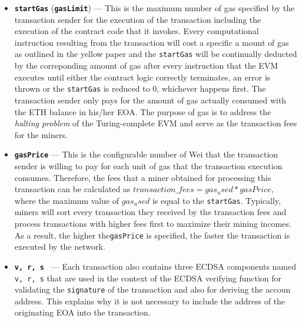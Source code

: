 \begin{itemize}
	\item \textbf{\texttt{startGas}} (\textbf{\texttt{gasLimit}}) --- This is the maximum number of gas specified by the transaction sender for the execution of the transaction including the execution of the contract code that it invokes.  Every computational instruction resulting from the transaction will cost a specific a mount of gas as outlined in the yellow paper \cite{wood2014ethereum} and the \texttt{startGas} will be continually deducted by the correponding amount of gas after every instruction that the EVM executes until either the contract logic correctly terminates, an error is thrown or the \texttt{startGas} is reduced to 0, whichever happens first. The transaction sender only pays for the amount of gas actually consumed with the ETH balance in his/her EOA. The purpose of gas is to address the \textit{halting problem} of the Turing-complete EVM and serve as the transaction fees for the miners.

	\item \textbf{\texttt{gasPrice}} --- This is the configurable number of Wei that the transaction sender is willing to pay for each unit of gas that the transaction execution consumes. Therefore, the fees that a miner obtained for processing this transaction can be calculated as $transaction\_fees = gas_used * gasPrice$, where the maximum value of $gas_used$ is equal to the \texttt{startGas}. Typically, miners will sort every transaction they received by the transaction fees and process transactions with higher fees first to maximize their mining incomes. As a result, the higher the\texttt{gasPrice} is specified, the faster the transaction is executed by the network.

	\item \textbf{\texttt{v, r, s }} --- Each transaction also contains three ECDSA components named \texttt{v, r, s} that are used in the context of the ECDSA verifying function for validating the \texttt{signature} of the transaction and also for deriving the accoun address. This explains why it is not necessary to include the address of the originating EOA into the transaction.  
\end{itemize}

